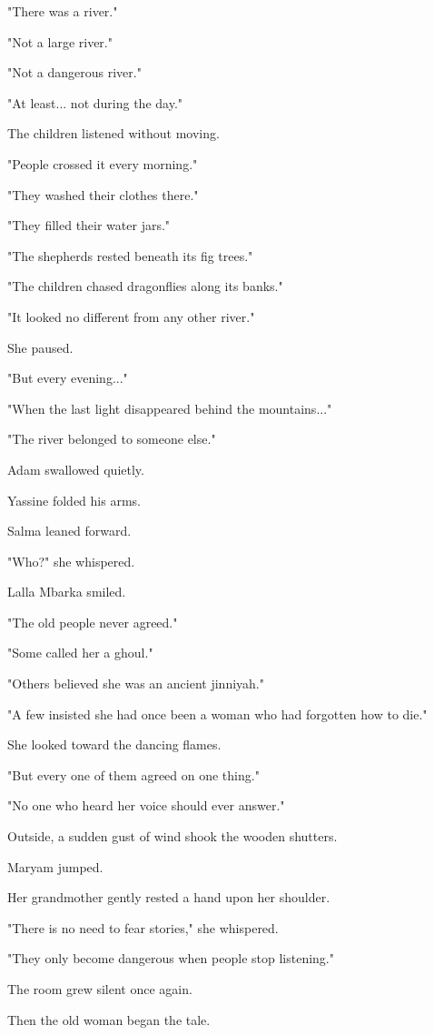 \documentclass[12pt,openany]{book}
\begin{document}
"There was a river."

"Not a large river."

"Not a dangerous river."

"At least... not during the day."

The children listened without moving.

"People crossed it every morning."

"They washed their clothes there."

"They filled their water jars."

"The shepherds rested beneath its fig trees."

"The children chased dragonflies along its banks."

"It looked no different from any other river."

She paused.

"But every evening..."

"When the last light disappeared behind the mountains..."

"The river belonged to someone else."

Adam swallowed quietly.

Yassine folded his arms.

Salma leaned forward.

"Who?" she whispered.

Lalla Mbarka smiled.

"The old people never agreed."

"Some called her a ghoul."

"Others believed she was an ancient jinniyah."

"A few insisted she had once been a woman who had forgotten how to die."

She looked toward the dancing flames.

"But every one of them agreed on one thing."

"No one who heard her voice should ever answer."

Outside, a sudden gust of wind shook the wooden shutters.

Maryam jumped.

Her grandmother gently rested a hand upon her shoulder.

"There is no need to fear stories," she whispered.

"They only become dangerous when people stop listening."

The room grew silent once again.

Then the old woman began the tale.
\end{document}
